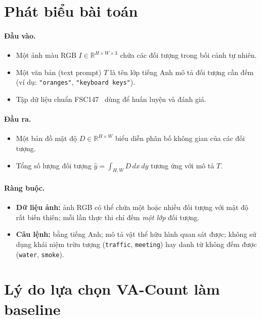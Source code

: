 \documentclass[a4paper,12pt]{report}
\numberwithin{figure}{chapter}
\numberwithin{table}{chapter}
\begin{document}
\section{Phát biểu bài toán}
\label{sec:problem-statement}

\paragraph{Đầu vào.}
\begin{itemize}
    \item Một ảnh màu RGB $I \in \mathbb{R}^{H \times W \times 3}$ chứa các đối tượng trong bối cảnh tự nhiên.
    \item Một văn bản (text prompt) $T$ là tên lớp tiếng Anh mô tả đối tượng cần đếm (ví dụ: \texttt{"oranges"}, \texttt{"keyboard keys"}).
    \item Tập dữ liệu chuẩn FSC147~\cite{ranjan2021fsc147} dùng để huấn luyện và đánh giá.
\end{itemize}

\paragraph{Đầu ra.}
\begin{itemize}
    \item Một bản đồ mật độ $D \in \mathbb{R}^{H \times W}$ biểu diễn phân bố không gian của các đối tượng.
    \item Tổng số lượng đối tượng $\hat{y} = \int_{H,W} D \, dx\, dy$ tương ứng với mô tả $T$.
\end{itemize}

\paragraph{Ràng buộc.}
\begin{itemize}
    \item \textbf{Dữ liệu ảnh:} ảnh RGB có thể chứa một hoặc nhiều đối tượng với mật độ rất biến thiên; mỗi lần thực thi chỉ đếm \emph{một lớp} đối tượng.
    \item \textbf{Câu lệnh:} bằng tiếng Anh; mô tả vật thể hữu hình quan sát được; không sử dụng khái niệm trừu tượng (\texttt{traffic}, \texttt{meeting}) hay danh từ không đếm được (\texttt{water}, \texttt{smoke}).
\end{itemize}

\section{Lý do lựa chọn VA-Count làm baseline}
\label{sec:why-vacount}
\end{document}
